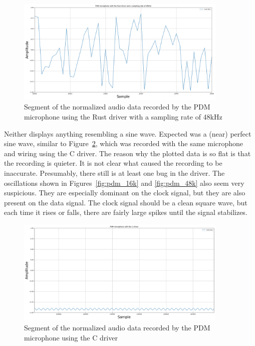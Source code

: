 \begin{figure}[H]
    \centering
    \includegraphics[width=0.9\textwidth]{figures/pdm/pdm_rust_48k.png}
    \caption[Segment of the normalized audio data recorded by the PDM microphone using the Rust driver with a sampling rate of 48kHz]
    {Segment of the normalized audio data recorded by the PDM microphone using the Rust driver with a sampling rate of 48kHz}
    \label{fig:pdm_rust_48k}
\end{figure}

Neither displays anything resembling a sine wave.
Expected was a (near) perfect sine wave, similar to Figure~\ref{fig:pdm_c},
which was recorded with the same microphone and wiring using the C driver.
The reason why the plotted data is so flat is that the recording is quieter.
It is not clear what caused the recording to be inaccurate.
Presumably, there still is at least one bug in the driver.
The oscillations shown in Figures~\ref{fig:pdm_16k} and \ref{fig:pdm_48k} also seem very suspicious.
They are especially dominant on the clock signal, but they are also present on the data signal.
The clock signal should be a clean square wave, but each time it rises or falls,
there are fairly large spikes until the signal stabilizes.

\begin{figure}[H]
    \centering
    \includegraphics[width=0.9\textwidth]{figures/pdm/pdm_c.png}
    \caption[Segment of the normalized audio data recorded by the PDM microphone using the C driver]{Segment of the normalized audio data recorded by the PDM microphone using the C driver}
    \label{fig:pdm_c}
\end{figure}


